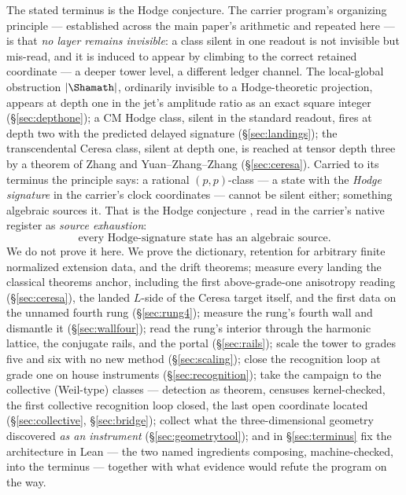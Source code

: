 \documentclass[11pt]{article}
\theoremstyle{definition}
\theoremstyle{remark}
\begin{document}
The stated terminus is the Hodge conjecture. The carrier program's organizing
principle --- established across the main paper's arithmetic and repeated here
--- is that \emph{no layer remains invisible}: a class silent in one readout is
not invisible but mis-read, and it is induced to appear by climbing to the
correct retained coordinate --- a deeper tower level, a different ledger
channel. The local-global obstruction $|\Shamath|$, ordinarily invisible to a
Hodge-theoretic projection, appears at depth one in the jet's amplitude ratio
as an exact square integer (\S\ref{sec:depthone}); a CM Hodge class, silent in
the standard readout, fires at depth two with the predicted delayed signature
(\S\ref{sec:landings}); the transcendental Ceresa class, silent at depth one,
is reached at tensor depth three by a theorem of Zhang and Yuan--Zhang--Zhang
(\S\ref{sec:ceresa}). Carried to its terminus the principle says: a rational
$(p,p)$-class --- a state with the \emph{Hodge signature} in the carrier's
clock coordinates --- cannot be silent either; something algebraic sources it.
That is the Hodge conjecture \cite{Hodge,DeligneClay}, read in the carrier's
native register as \emph{source exhaustion}:
\[
  \boxed{\ \text{every Hodge-signature state has an algebraic source.}\ }
\]
We do not prove it here. We prove the dictionary, retention for arbitrary finite
normalized extension data, and the drift theorems; measure every landing the classical theorems anchor, including
the first above-grade-one anisotropy reading (\S\ref{sec:ceresa}), the landed
$L$-side of the Ceresa target itself, and the
first data on the unnamed fourth rung (\S\ref{sec:rung4}); measure the rung's
fourth wall and dismantle it (\S\ref{sec:wallfour}); read the rung's interior
through the harmonic lattice, the conjugate rails, and the portal
(\S\ref{sec:rails}); scale the tower to grades five and six with no new
method (\S\ref{sec:scaling}); close the
recognition loop at grade one on house instruments (\S\ref{sec:recognition});
take the campaign to the collective (Weil-type) classes --- detection as
theorem, censuses kernel-checked, the first collective recognition loop
closed, the last open coordinate located (\S\ref{sec:collective},
\S\ref{sec:bridge}); collect what the three-dimensional geometry
discovered \emph{as an instrument} (\S\ref{sec:geometrytool});
and in \S\ref{sec:terminus} fix the architecture in Lean --- the two named
ingredients composing, machine-checked, into the terminus --- together with
what evidence would refute the program on the way.
\end{document}
